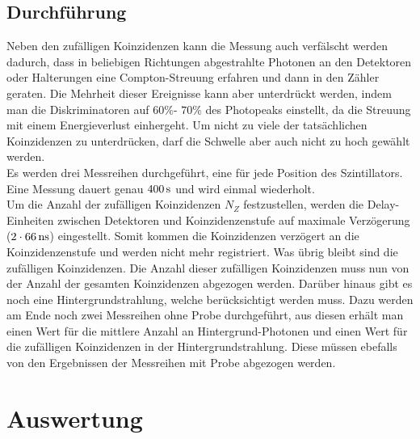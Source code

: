 \documentclass[a4paper,titlepage]{scrartcl}
\numberwithin{equation}{section}
\begin{document}
\subsection{Durchführung}
Neben den zufälligen Koinzidenzen kann die Messung auch verfälscht werden dadurch, dass in beliebigen Richtungen abgestrahlte Photonen an den Detektoren oder Halterungen eine Compton-Streuung erfahren und dann in den Zähler geraten. Die Mehrheit dieser Ereignisse kann aber unterdrückt werden, indem man die Diskriminatoren auf $60 \%$- $70 \%$ des Photopeaks einstellt, da die Streuung mit einem Energieverlust einhergeht. Um nicht zu viele der tatsächlichen Koinzidenzen zu unterdrücken, darf die Schwelle aber auch nicht zu hoch gewählt werden.\\
Es werden drei Messreihen durchgeführt, eine für jede Position des Szintillators. Eine Messung dauert genau $\unit[400]{s}$ und wird einmal wiederholt.\\
Um die Anzahl der zufälligen Koinzidenzen $N_Z$ festzustellen, werden die Delay-Einheiten zwischen Detektoren und Koinzidenzenstufe auf maximale Verzögerung ($2 \cdot \unit[66]{ns}$) eingestellt. Somit kommen die Koinzidenzen verzögert an die Koinzidenzenstufe und werden nicht mehr registriert. Was übrig bleibt sind die zufälligen Koinzidenzen. Die Anzahl dieser zufälligen Koinzidenzen muss nun von der Anzahl der gesamten Koinzidenzen abgezogen werden. Darüber hinaus gibt es noch eine Hintergrundstrahlung, welche berücksichtigt werden muss. Dazu werden am Ende noch zwei Messreihen ohne Probe durchgeführt, aus diesen erhält man einen Wert für die mittlere Anzahl an Hintergrund-Photonen und einen Wert für die zufälligen Koinzidenzen in der Hintergrundstrahlung. Diese müssen ebefalls von den Ergebnissen der Messreihen mit Probe abgezogen werden.

\section{Auswertung}
\end{document}
